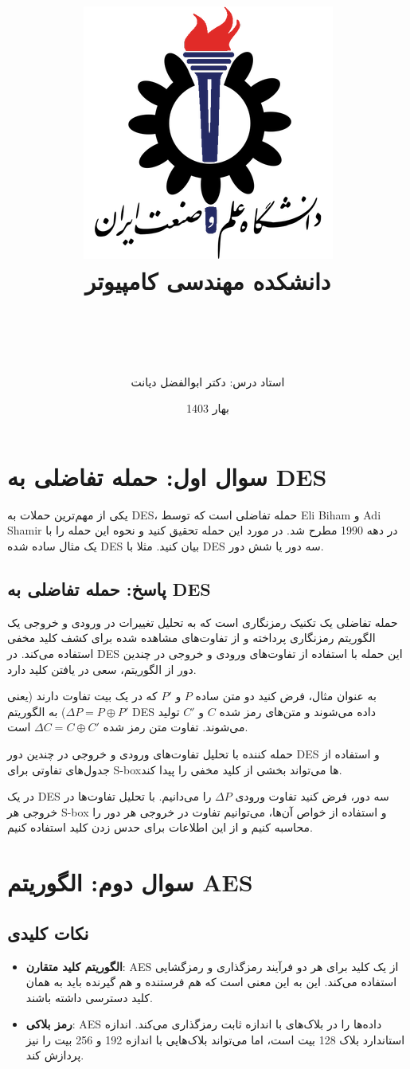 \documentclass[11pt]{article}
\title{
    \includegraphics[width=0.5\linewidth]{images/IUST_logo_color.png} \\
    دانشکده مهندسی کامپیوتر \\
}
\author{
    \Course \\ \vspace{0.5cm}
    \Subject \\ \vspace{0.5cm}
    \Author \\ \vspace{0.5cm}
    \StudentNumber \\ \vspace{0.5cm}
    استاد درس: دکتر ابوالفضل دیانت
}
\date{بهار 1403}
\begin{document}
    \maketitle
    \newpage
\section*{سوال اول: حمله تفاضلی به DES}

یکی از مهم‌ترین حملات به DES، حمله تفاضلی است که توسط Eli Biham و Adi Shamir در دهه 1990 مطرح شد. در مورد این حمله تحقیق کنید و نحوه این حمله را با یک مثال ساده شده DES بیان کنید. مثلا با DES سه دور یا شش دور.

\subsection*{پاسخ: حمله تفاضلی به DES}

حمله تفاضلی یک تکنیک رمزنگاری است که به تحلیل تغییرات در ورودی و خروجی یک الگوریتم رمزنگاری پرداخته و از تفاوت‌های مشاهده شده برای کشف کلید مخفی استفاده می‌کند. در DES این حمله با استفاده از تفاوت‌های ورودی و خروجی در چندین دور از الگوریتم، سعی در یافتن کلید دارد.

به عنوان مثال، فرض کنید دو متن ساده $P$ و $P'$ که در یک بیت تفاوت دارند (یعنی $\Delta P = P \oplus P'$) به الگوریتم DES داده می‌شوند و متن‌های رمز شده $C$ و $C'$ تولید می‌شوند. تفاوت متن رمز شده $\Delta C = C \oplus C'$ است.

حمله کننده با تحلیل تفاوت‌های ورودی و خروجی در چندین دور DES و استفاده از جدول‌های تفاوتی برای S-boxها می‌تواند بخشی از کلید مخفی را پیدا کند.

در یک DES سه دور، فرض کنید تفاوت ورودی $\Delta P$ را می‌دانیم. با تحلیل تفاوت‌ها در خروجی هر S-box و استفاده از خواص آن‌ها، می‌توانیم تفاوت در خروجی هر دور را محاسبه کنیم و از این اطلاعات برای حدس زدن کلید استفاده کنیم.

\section*{سوال دوم: الگوریتم AES }
\subsection*{نکات کلیدی}
\begin{itemize}
    \item \textbf{الگوریتم کلید متقارن}: AES از یک کلید برای هر دو فرآیند رمزگذاری و رمزگشایی استفاده می‌کند. این به این معنی است که هم فرستنده و هم گیرنده باید به همان کلید دسترسی داشته باشند.
    \item \textbf{رمز بلاکی}: AES داده‌ها را در بلاک‌های با اندازه ثابت رمزگذاری می‌کند. اندازه استاندارد بلاک 128 بیت است، اما می‌تواند بلاک‌هایی با اندازه 192 و 256 بیت را نیز پردازش کند.
\end{itemize}
\end{document}
